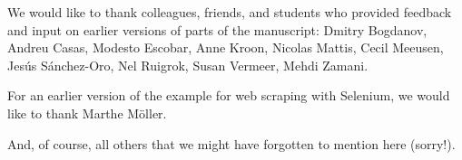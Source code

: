 We would like to thank colleagues, friends, and students who provided feedback and input on earlier versions of parts of the manuscript: 
Dmitry Bogdanov,
Andreu Casas,
Modesto Escobar,
Anne Kroon,
Nicolas Mattis,
Cecil Meeusen,
Jes\'us S\'anchez-Oro,
Nel Ruigrok,
Susan Vermeer,
Mehdi Zamani.

For an earlier version of the example for web scraping with Selenium, we would like to thank Marthe M\"oller.

And, of course, all others that we might have forgotten to mention here (sorry!).

